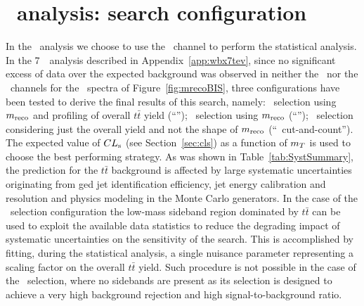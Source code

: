 \clearpage{\pagestyle{empty}\cleardoublepage}

\chapter{\wbx\ analysis: search configuration}\label{app:wbx_statanalyses}

In the \wbx\ analysis we choose to use the \tight\ channel
to perform the statistical analysis. In the 7~\tev\ analysis
described in Appendix~\ref{app:wbx7tev},
since no significant excess of data over the 
expected background was observed in neither the \loose\ nor
the \tight\ channels for the \mreco\ spectra 
of Figure~\ref{fig:mrecoBIS},
three configurations have been tested to derive the final
results of this search, namely: \loose\ selection using 
$m_{\rm reco}$ and profiling of overall $t\bar{t}$ yield (``\loose''); \tight\ selection using $m_{\rm reco}$
(``\tight''); \tight\ selection  considering just the overall yield and not 
the shape of $m_{\rm reco}$ (``\tight\ cut-and-count'').
The expected value of $CL_{\rm s}$ (see Section~\ref{sec:cls})
as a function of $m_{\T}$ is
used to choose the best performing strategy.
As was shown in Table~\ref{tab:SystSummary}, the prediction for 
the $t\bar{t}$ background is affected by 
large systematic uncertainties originating from \btag ged jet 
identification efficiency, 
jet energy calibration and resolution and physics modeling in the Monte
Carlo generators. 
In the case of the \loose\ selection configuration the low-mass sideband
region dominated by $t\bar{t}$ can be used to exploit the available data 
statistics to reduce the degrading 
impact of systematic uncertainties on the sensitivity of the search. 
This is accomplished by fitting, during the statistical analysis,
a single nuisance parameter representing a scaling factor on 
the overall $t\bar{t}$ yield. Such procedure is
not possible in the case of the \tight\ selection, where no
sidebands are present as its selection is designed 
to achieve a very high background rejection and high signal-to-background ratio.

